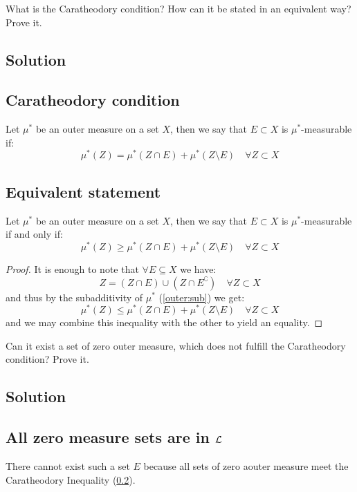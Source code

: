 
\question
What is the Caratheodory condition? How can it be stated in an equivalent way? Prove it.

\subsection*{Solution}

\subsection{Caratheodory condition} \label{CarEq}
Let $\mu^*$ be an outer measure on a set $X$, then we say that $E\subset X$ is $\mu^*$-measurable if:
\[
    \mu^*(Z) = \mu^*(Z\cap E) + \mu^*(Z\setminus E) \quad \forall Z\subset X
\]

\subsection{Equivalent statement}\label{CarIneq}
Let $\mu^*$ be an outer measure on a set $X$, then we say that $E\subset X$ is $\mu^*$-measurable if and only if:
\[
    \mu^*(Z) \geq \mu^*(Z\cap E) + \mu^*(Z\setminus E) \quad \forall Z\subset X
\]
\begin{proof}
    It is enough to note that $\forall E\subseteq X$ we have:
    \[
        Z = (Z\cap E) \cup (Z \cap E^\complement) \quad \forall Z\subset X
    \]
    and thus by the subadditivity of $\mu^*$ (\ref{outer:sub}) we get:
        \[
        \mu^*(Z) \leq \mu^*(Z\cap E) + \mu^*(Z\setminus E) \quad \forall Z\subset X
    \]
    and we may combine this inequality with the other to yield an equality.
\end{proof}


\question
Can it exist a set of zero outer measure, which does not fulfill the Caratheodory condition? Prove it.

\subsection*{Solution}

\subsection{All zero measure sets are in \texorpdfstring{$\mathcal{L}$}{L}} \label{zerosetsaremeas}
There cannot exist such a set $E$ because all sets of zero aouter measure meet the Caratheodory Inequality (\ref{CarIneq}).


